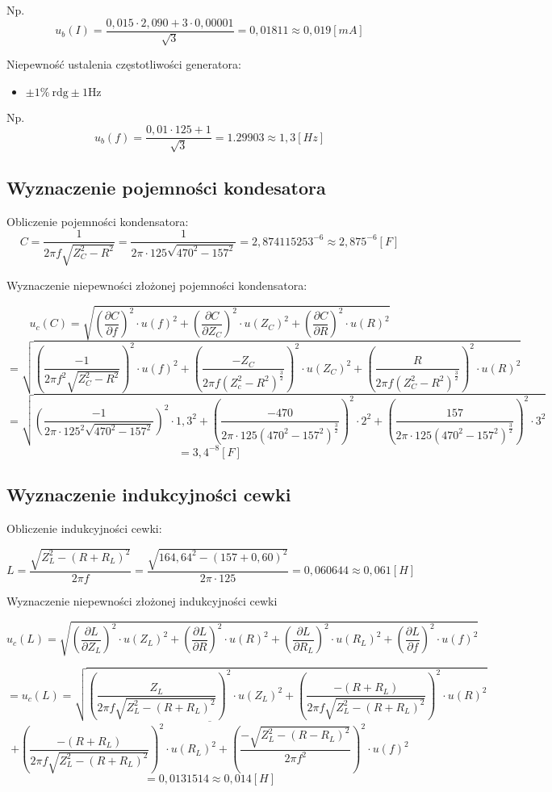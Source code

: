 \documentclass[12pt]{article}
\newcommand{\dpartial}[2]{\frac{\partial #1}{\partial #2}}
\newcommand{\physdpartial}[2]{\left( \dpartial{#1}{#2} \right)^2}
\newcommand{\powfrac}[2]{\left( \frac{#1}{#2} \right)^2}
\newcommand{\powsq}[1]{\left( #1 \right)^{\frac{3}{2}}}
\begin{document}
Np. 
\[ u_b(I) = \frac{0,015 \cdot 2,090 + 3 \cdot 0,00001}{\sqrt3} = 0,01811 \approx 0,019[mA] \] \bigskip

Niepewność ustalenia częstotliwości generatora:
\begin{itemize}
    \item $ \pm 1\% \ \textrm{rdg} \pm 1 \textrm{Hz} $
\end{itemize}

Np.
\[ u_b(f) = \frac{0,01 \cdot 125 + 1}{\sqrt{3}} = 1.29903 \approx 1,3[Hz] \]

\subsection{Wyznaczenie pojemności kondesatora}

Obliczenie pojemności kondensatora:
\[ C = \frac{1}{2 \pi f \sqrt{Z_C^2 - R^2}} = \frac{1}{2 \pi \cdot 125 \sqrt{470^2 - 157^2}} = 2,874115253^{-6} \approx 2,875^{-6}[F] \]

Wyznaczenie niepewności złożonej pojemności kondensatora:

\[ u_c(C) = \sqrt{ \physdpartial{C}{f} \cdot u(f)^2 + \physdpartial{C}{Z_C} \cdot u(Z_C)^2 + \physdpartial{C}{R} \cdot u(R)^2 } \]
\[ = \sqrt{ \powfrac{-1}{2 \pi f^2 \sqrt{Z_C^2 - R^2}} \cdot u(f)^2 + \powfrac{-Z_C}{2 \pi f \powsq{Z_c^2 - R^2} } \cdot u(Z_C)^2 + \powfrac{R}{2 \pi f \powsq{Z_C^2 - R^2}} \cdot u(R)^2 } \]
\[ = \sqrt{ \powfrac{-1}{2 \pi \cdot 125^2 \sqrt{470^2 - 157^2}} \cdot 1,3^2 + \powfrac{-470}{2 \pi \cdot 125 \powsq{470^2 - 157^2} } \cdot 2^2 + \powfrac{157}{2\pi \cdot 125 \powsq{470^2 - 157^2} } \cdot 3^2 } \]
\[ = 3,4^{-8}[F] \]

\subsection{Wyznaczenie indukcyjności cewki}

Obliczenie indukcyjności cewki:

\[ L = \frac{ \sqrt{Z_L^2 - (R + R_L)^2} }{2 \pi f} = \frac{ \sqrt{ 164,64^2 - (157 + 0,60)^2 }}{2 \pi \cdot 125} = 0,060644 \approx 0,061[H] \]

Wyznaczenie niepewności złożonej indukcyjności cewki 

\[ u_c(L) = \sqrt{ \physdpartial{L}{Z_L} \cdot u(Z_L)^2 + \physdpartial{L}{R} \cdot u(R)^2 + \physdpartial{L}{R_L} \cdot u(R_L)^2 + \physdpartial{L}{f} \cdot u(f)^2 } \]

\[ = u_c(L) = \sqrt{ \powfrac{Z_L}{2\pi f \sqrt{Z_L^2 - (R + R_L)^2}} \cdot u(Z_L)^2 + \powfrac{-(R + R_L)}{2\pi f \sqrt{Z_L^2 - (R + R_L)^2}} \cdot u(R)^2 } \]
\[ \overline{+ \powfrac{-(R + R_L)}{2\pi f \sqrt{Z_L^2 - (R + R_L)^2}} \cdot u(R_L)^2 + \powfrac{- \sqrt{Z_L^2 - (R - R_L)^2}}{2 \pi f^2} \cdot u(f)^2 } \]
\[ = 0,0131514 \approx 0,014[H] \]
\end{document}
